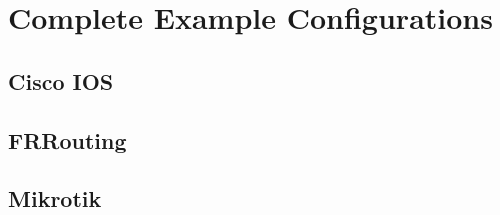 \chapter{Complete Example Configurations}
\label{app:CompleteConfigs}
\section{Cisco IOS}
\section{FRRouting}
\section{Mikrotik}
